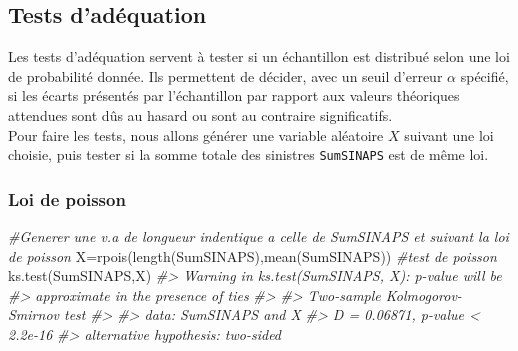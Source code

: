\documentclass[
]{book}
\newenvironment{Shaded}{\begin{snugshade}}{\end{snugshade}}
\newcommand{\CommentTok}[1]{\textcolor[rgb]{0.56,0.35,0.01}{\textit{#1}}}
\newcommand{\FunctionTok}[1]{\textcolor[rgb]{0.00,0.00,0.00}{#1}}
\newcommand{\NormalTok}[1]{#1}
\newcommand{\OtherTok}[1]{\textcolor[rgb]{0.56,0.35,0.01}{#1}}
\newcommand{\SpecialCharTok}[1]{\textcolor[rgb]{0.00,0.00,0.00}{#1}}
\theoremstyle{definition}
\theoremstyle{definition}
\theoremstyle{definition}
\theoremstyle{definition}
\theoremstyle{remark}
\begin{document}
\hypertarget{tests-daduxe9quation}{%
\subsection{Tests d'adéquation}\label{tests-daduxe9quation}}

Les tests d'adéquation servent à tester si un échantillon est distribué selon une loi
de probabilité donnée. Ils permettent de décider, avec un seuil d'erreur \(\alpha\) spécifié, si les écarts présentés par l'échantillon par rapport aux valeurs théoriques attendues sont dûs au hasard ou sont au contraire significatifs.\\
Pour faire les tests, nous allons générer une variable aléatoire \(X\) suivant une loi choisie, puis tester si la somme totale des sinistres \texttt{SumSINAPS} est de même loi.

\begin{Shaded}
\end{Shaded}

\hypertarget{loi-de-poisson}{%
\subsubsection{Loi de poisson}\label{loi-de-poisson}}

\begin{Shaded}
\begin{Highlighting}[]
\CommentTok{\#Generer une v.a de longueur indentique a celle de SumSINAPS et suivant la loi de poisson}
\NormalTok{X}\OtherTok{=}\FunctionTok{rpois}\NormalTok{(}\FunctionTok{length}\NormalTok{(SumSINAPS),}\FunctionTok{mean}\NormalTok{(SumSINAPS))}
\CommentTok{\#test de poisson}
\FunctionTok{ks.test}\NormalTok{(SumSINAPS,X)}
\CommentTok{\#\textgreater{} Warning in ks.test(SumSINAPS, X): p{-}value will be}
\CommentTok{\#\textgreater{} approximate in the presence of ties}
\CommentTok{\#\textgreater{} }
\CommentTok{\#\textgreater{}  Two{-}sample Kolmogorov{-}Smirnov test}
\CommentTok{\#\textgreater{} }
\CommentTok{\#\textgreater{} data:  SumSINAPS and X}
\CommentTok{\#\textgreater{} D = 0.06871, p{-}value \textless{} 2.2e{-}16}
\CommentTok{\#\textgreater{} alternative hypothesis: two{-}sided}
\end{Highlighting}
\end{Shaded}
\end{document}
